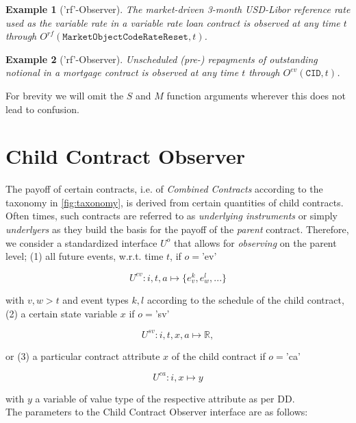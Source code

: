 \documentclass[9pt,oneside]{amsart}
\newtheorem{example}{Example}
\newcommand{\Real}{\mathbb{R}}
\newcommand{\attr}[1]{\texttt{#1}}
\newcommand{\obs}[3]{O^{#1}(#2,#3)}
\newcommand{\cldfunc}[1]{U^{#1}}
\begin{document}
\begin{multicols}{2}
\begin{example}['rf'-Observer] The market-driven 3-month USD-Libor reference rate used as the variable rate in a variable rate loan contract is observed at any time $t$ through $\obs{rf}{\attr{MarketObjectCodeRateReset}}{t}$.
\end{example}

\begin{example}['rf'-Observer] Unscheduled (pre-) repayments of outstanding notional in a mortgage contract is observed at any time $t$ through $\obs{ev}{\attr{CID}}{t}$.
\end{example}

For brevity we will omit the $S$ and $M$ function arguments wherever this does not lead to confusion.




\section{Child Contract Observer}\label{sec:cldobserver}

The payoff of certain contracts, i.e. of \textit{Combined Contracts} according to the taxonomy in \ref{fig:taxonomy}, is derived from certain quantities of child contracts. Often times, such contracts are referred to as \textit{underlying instruments} or simply \textit{underlyers} as they build the basis for the payoff of the \textit{parent} contract. Therefore, we consider a standardized interface $\cldfunc{o}$ that allows for \textit{observing} on the parent level; (1) all future events, w.r.t. time $t$, if $o=$'ev'

\[
	\cldfunc{ev}: i,t,a \mapsto \{e_v^{k},e_w^{l},...\}
\]

with $v,w>t$ and event types $k,l$ according to the schedule of the child contract, (2) a certain state variable $x$ if $o=$'sv'

\[
	\cldfunc{sv}: i,t,x,a \mapsto \Real,
\]

or (3) a particular contract attribute $x$ of the child contract if $o=$'ca'

\[
	\cldfunc{ca}: i,x \mapsto y
\]

with $y$ a variable of value type of the respective attribute as per DD.\\

The parameters to the Child Contract Observer interface are as follows:


\end{multicols}
\end{document}
